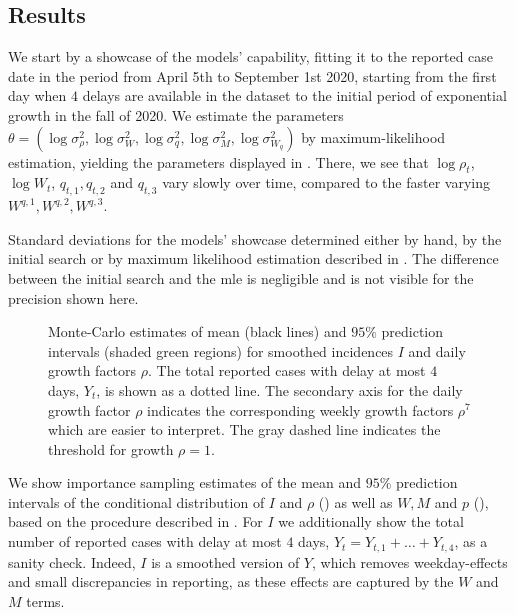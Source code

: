 \subsection{Results}
We start by a showcase of the models' capability, fitting it to the reported case date in the period from April 5th to September 1st 2020, starting from the first day when $4$ delays are available in the dataset to the initial period of exponential growth in the fall of 2020. We estimate the parameters $\theta = \left( \log \sigma^{2}_{\rho}, \log \sigma^{2}_W, \log \sigma^{2}_q, \log \sigma^{2}_M, \log \sigma^{2}_{W_{q}}\right)$ by maximum-likelihood estimation, yielding the parameters displayed in . There, we see that $\log \rho_{t}$, $\log W_{t}$, $q_{t,1}, q_{t,2}$ and $ q_{t,3}$ vary slowly over time, compared to the faster varying $W^{q, 1}, W^{q,2}, W^{q,3}$. 

\begin{table}
    \centering
    
    \label{tab:showcase-parameters}
    \caption{Standard deviations for the models' showcase determined either by hand, by the initial search or by maximum likelihood estimation described in . The difference between the initial search and the \acrshort{mle} is negligible and is not visible for the precision shown here.}
\end{table}
\begin{figure}
    \resizebox{\textwidth}{!}{%
    }
    \caption{Monte-Carlo estimates of mean (black lines) and $95\%$ prediction intervals (shaded green regions) for smoothed incidences $I$ and daily growth factors $\rho$. The total reported cases with delay at most $4$ days,  $Y_{t}$, is shown as a dotted line. The secondary axis for the daily growth factor $\rho$ indicates the corresponding weekly growth factors $\rho^{7}$ which are easier to interpret. The gray dashed line indicates the threshold for growth $\rho = 1$.}
    \label{fig:showcase_prediction_intervals_I_rho}
\end{figure}

We show importance sampling estimates of the mean and $95\%$ prediction intervals of the conditional distribution of $I$ and $\rho$ () as well as $W,M$ and $p$ (), based on the procedure described in . For $I$ we additionally show the total number of reported cases with delay at most $4$ days, $Y_{t} = Y_{t, 1} + \dots + Y_{t, 4}$, as a sanity check. Indeed, $I$ is a smoothed version of $Y$, which removes weekday-effects and small discrepancies in reporting, as these effects are captured by the $W$ and $M$ terms.

